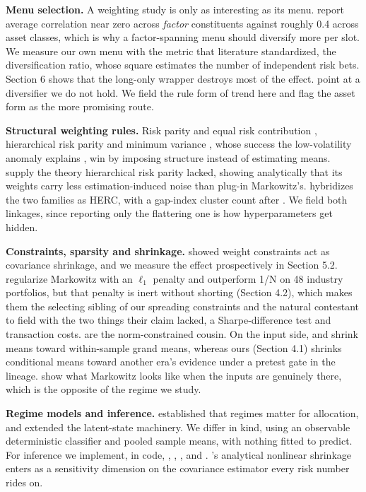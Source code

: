 \documentclass[12pt,letterpaper]{article}
\newcommand{\head}[1]{\noindent\textbf{#1}\hspace{0.5em}\ignorespaces}
\begin{document}
\head{Menu selection.} A weighting study is only as interesting as its menu.
\citet{ilmanen2012} report average correlation near zero across \emph{factor}
constituents against roughly 0.4 across asset classes, which is why a
factor-spanning menu should diversify more per slot. We measure our own menu with
the metric that literature standardized, the \citet{choueifaty2008}
diversification ratio, whose square estimates the number of independent risk bets.
Section 6 shows that the long-only wrapper destroys most of the effect.
\citet{hurst2017} point at a diversifier we do not hold. We field the rule form of
trend here and flag the asset form as the more promising route.

\head{Structural weighting rules.} Risk parity and equal risk contribution
\citep{maillard2010,asness2012}, hierarchical risk parity \citep{lopezdeprado2016}
and minimum variance \citep{clarke2006}, whose success the low-volatility anomaly
explains \citep{haugen1991,frazzini2014}, win by imposing structure instead of
estimating means. \citet{antonov2025} supply the theory hierarchical risk parity
lacked, showing analytically that its weights carry less estimation-induced noise
than plug-in Markowitz's. \citet{raffinot2018} hybridizes the two families as
HERC, with a gap-index cluster count after \citet{tibshirani2001}. We field both
linkages, since reporting only the flattering one is how hyperparameters get
hidden.

\head{Constraints, sparsity and shrinkage.} \citet{jagannathan2003} showed weight
constraints act as covariance shrinkage, and we measure the effect prospectively
in Section 5.2. \citet{brodie2009} regularize Markowitz with an $\ell_1$ penalty
and outperform 1/N on 48 industry portfolios, but that penalty is inert without
shorting (Section 4.2), which makes them the selecting sibling of our spreading
constraints and the natural contestant to field with the two things their claim
lacked, a Sharpe-difference test and transaction costs.
\citet{demiguel2009norm} are the norm-constrained cousin. On the input side,
\citet{jorion1986} and \citet{frost1986} shrink means toward within-sample grand
means, whereas ours (Section 4.1) shrinks conditional means toward another era's
evidence under a pretest gate in the \citet{judge1978} lineage.
\citet{boyd2024} show what Markowitz looks like when the inputs are genuinely
there, which is the opposite of the regime we study.

\head{Regime models and inference.} \citet{ang2002,ang2004} established that
regimes matter for allocation, and \citet{guidolin2007} extended the latent-state
machinery. We differ in kind, using an observable deterministic classifier and
pooled sample means, with nothing fitted to predict. For inference we implement,
in code, \citet{ledoit2008}, \citet{bailey2014}, \citet{bailey2017},
\citet{demsar2006} and \citet{politis1994}. \citeauthor{ledoit2020}'s
\citeyearpar{ledoit2020} analytical nonlinear shrinkage enters as a sensitivity
dimension on the covariance estimator every risk number rides on.
\end{document}
